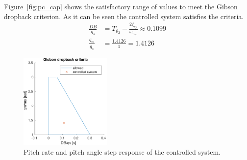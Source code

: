 Figure~\ref{fig:pc_cap} shows the satisfactory range of values to meet the Gibson dropback criterion. As it can be seen the controlled system satisfies the criteria.
\begin{align}
    \label{eq:gibvals}
    \frac{DB}{q_s} &= T_{\theta_2} - \frac{2\zeta_{sp}}{\omega_{n_{sp}}} \approx 0.1099 \\
    \frac{q_m}{q_s} &= \frac{1.4126}{1} = 1.4126
\end{align}

\begin{figure}[ht]
    \centering
    \includegraphics[width=0.4\textwidth]{figures/pc_gib.pdf}    
    \caption{Pitch rate and pitch angle step response of the controlled system.}
    \label{fig:pc_gib}
\end{figure}



\clearpage
